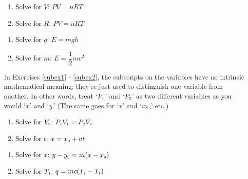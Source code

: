 \documentclass{ximera}
\begin{document}
\begin{multicols}{2}
\begin{enumerate}
\setcounter{enumi}{\value{HW}}
\item Solve for $V$:   $PV = nRT$
\item Solve for $R$:  $PV = nRT$
\setcounter{HW}{\value{enumi}}
\end{enumerate}
\end{multicols}

\begin{multicols}{2}
\begin{enumerate}
\setcounter{enumi}{\value{HW}}
\item Solve for $g$:   $E = mgh$ 
\item Solve for $m$:  $E = \dfrac{1}{2} mv^2$
\setcounter{HW}{\value{enumi}}
\end{enumerate}
\end{multicols}

In Exercises \ref{subex1} - \ref{subex2}, the subscripts on the variables have no intrinsic mathematical meaning; they're just used to distinguish one variable from another.  In other words, treat `$P_{\text{\tiny $1$}}$' and `$P_{\text{\tiny $2$}}$'  as two different variables as you would `$x$' and `$y$.'  (The same goes for `$x$' and `$x_{\text{\tiny $0$}}$,'  etc.)

\begin{multicols}{2}
\begin{enumerate}
\setcounter{enumi}{\value{HW}}
\item Solve for $V_{\text{\tiny $2$}}$:  $P_{\text{\tiny $1$}}V_{\text{\tiny $1$}} = P_{\text{\tiny $2$}}V_{\text{\tiny $2$}}$  \label{subex1}
\item Solve for $t$:  $x = x_{\text{\tiny $0$}} + at$ 
\setcounter{HW}{\value{enumi}}
\end{enumerate}
\end{multicols}


\begin{multicols}{2}
\begin{enumerate}
\setcounter{enumi}{\value{HW}}
\item Solve for $x$:   $y-y_{\text{\tiny $0$}} = m(x -x_{\text{\tiny $0$}})$
\item Solve for $T_{\text{\tiny $1$}}$:  $q = mc(T_{\text{\tiny $2$}} -T_{\text{\tiny $1$}})$  \label {subex2} \label{literalexlast}
\setcounter{HW}{\value{enumi}}
\end{enumerate}
\end{multicols}
\end{document}
